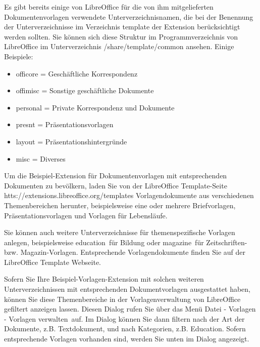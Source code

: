 \documentclass[12pt,a4paper,titlepage]{book}
\begin{document}
Es gibt bereits einige von LibreOffice für die von ihm mitgelieferten Dokumentenvorlagen verwendete Unterverzeichnisnamen, die bei der Benennung der Unterverzeichnisse im Verzeichnis template der Extension berücksichtigt werden sollten. Sie können sich diese Struktur im Programmverzeichnis von LibreOffice im Unterverzeichnis /share/template/common ansehen. Einige Beispiele:
\begin{itemize}
	\item officore = Geschäftliche Korrespondenz
	\item offimisc = Sonstige geschäftliche Dokumente
	\item personal = Private Korrespondenz und Dokumente
	\item presnt = Präsentationsvorlagen
	\item layout = Präsentationshintergründe
	\item misc = Diverses
\end{itemize}

Um die Beispiel-Extension für Dokumentenvorlagen mit entsprechenden Dokumenten zu bevölkern, laden Sie von der LibreOffice Template-Seite htts://extensions.libreoffice.org/templates Vorlagendokumente aus verschiedenen Themenbereichen herunter, beispielsweise eine oder mehrere Briefvorlagen, Präsentationsvorlagen und Vorlagen für Lebensläufe.

Sie können auch weitere Unterverzeichnisse für themenspezifische Vorlagen anlegen, beispielsweise \glqq education\grqq~für Bildung oder \glqq magazine\grqq~für Zeitschriften- bzw. Magazin-Vorlagen. Entsprechende Vorlagendokumente finden Sie auf der LibreOffice Template Webseite.

Sofern Sie Ihre Beispiel-Vorlagen-Extension mit solchen weiteren Unterverzeichnissen mit entsprechenden Dokumentvorlagen ausgestattet haben, können Sie diese Themenbereiche in der Vorlagenverwaltung von LibreOffice gefiltert anzeigen lassen. Diesen Dialog rufen Sie über das Menü \glqq Datei - Vorlagen - Vorlagen verwalten\grqq~auf. Im Dialog können Sie dann filtern nach der Art der Dokumente, z.B. Textdokument, und nach Kategorien, z.B. Education. Sofern entsprechende Vorlagen vorhanden sind, werden Sie unten im Dialog angezeigt.
\end{document}
